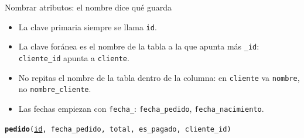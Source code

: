 \documentclass[aspectratio=169,10pt,c]{beamer}
\newcommand{\tbl}[1]{\textcolor{utpNaranja}{\texttt{#1}}}
\newcommand{\tblb}[1]{\textcolor{utpNaranja}{\textbf{\texttt{#1}}}}
\begin{document}
\begin{frame}{Nombrar atributos: el nombre dice qué guarda}
\begin{itemize}\setlength\itemsep{5pt}\small
  \item La clave primaria siempre se llama \texttt{id}.
  \item La clave foránea es el nombre de la tabla a la que apunta más \texttt{\_id}: \texttt{cliente\_id} apunta a \tbl{cliente}.
  \item No repitas el nombre de la tabla dentro de la columna: en \tbl{cliente} va \texttt{nombre}, no \texttt{nombre\_cliente}.
  \item Las fechas empiezan con \texttt{fecha\_}: \texttt{fecha\_pedido}, \texttt{fecha\_nacimiento}.
\end{itemize}
\vspace{0.2cm}
\vspace{0.1cm}
\begin{center}
\small \tblb{pedido}\texttt{(\underline{id}, fecha\_pedido, total, es\_pagado, cliente\_id)}
\end{center}
\end{frame}
\end{document}
